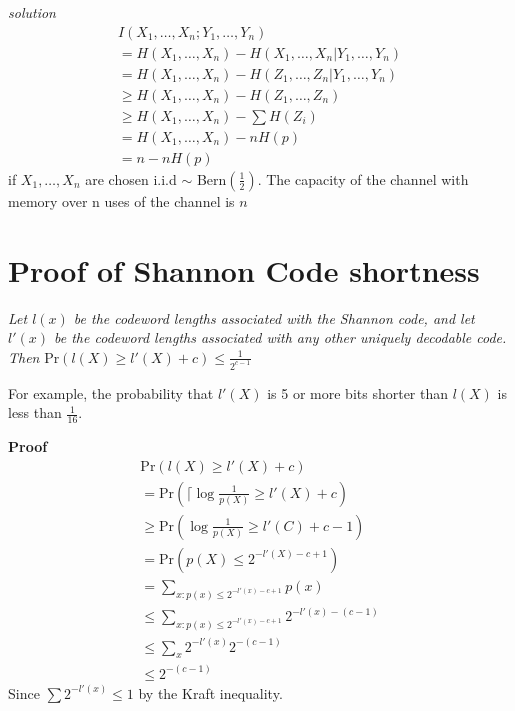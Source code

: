 \documentclass[10pt]{article}
\begin{document}
\begin{tiny}
\begin{multicols}{3}

{\it solution} 
\begin{eqnarray*}
I(X_{1},\ldots,X_{n};Y_{1},\ldots,Y_{n})\\
= H(X_{1},\ldots,X_{n})-H(X_{1},\ldots,X_{n}|Y_{1},\ldots,Y_{n})\\
= H(X_{1},\ldots,X_{n}) - H(Z_{1},\ldots,Z_{n}|Y_{1},\ldots,Y_{n})\\
\geq H(X_{1},\ldots,X_{n}) - H(Z_{1},\ldots,Z_{n})\\
\geq H(X_{1},\ldots,X_{n}) - \sum H(Z_{i})\\
=H(X_{1},\ldots,X_{n}) - nH(p)\\
=n - nH(p)
\end{eqnarray*}
if $X_{1},\ldots,X_{n}$ are chosen i.i.d $\sim$ Bern$\left( \frac{1}{2}\right)$. The capacity of the channel with memory over n uses of the channel is $n$


\section*{Proof of Shannon Code shortness}
{\it Let $l(x)$ be the codeword lengths associated with the Shannon code, and let $l'(x)$ be the codeword lengths associated with any other uniquely decodable code. Then} Pr$(l(X) \geq l'(X) + c)\leq \frac{1}{2^{c-1}}$

For example, the probability that $l'(X)$ is 5 or more bits shorter than $l(X)$ is less than $\frac{1}{16}$. 

{\bf Proof}
\begin{eqnarray*}
\text{Pr}(l(X) \geq l'(X) + c)\\
=\text{Pr}\left(\lceil \log \frac{1}{p(X)} \geq l'(X) + c \right)\\
\geq \text{Pr}\left( \log \frac{1}{p(X)} \geq l'(C) + c - 1 \right)\\
=\text{Pr}\left( p(X) \leq 2^{-l'(X)-c+1}\right)\\
=\sum_{x:p(x)\leq 2^{-l'(x)-c+1}} p(x)\\
\leq \sum_{x:p(x)\leq 2^{-l'(x)-c+1}}2^{-l'(x)-(c-1)} \\
\leq \sum_{x}2^{-l'(x)}2^{-(c-1)}\\
\leq 2^{-(c-1)}
\end{eqnarray*}
Since $\sum 2^{-l'(x)} \leq 1$ by the Kraft inequality.


\end{multicols}
\end{tiny}
\end{document}
